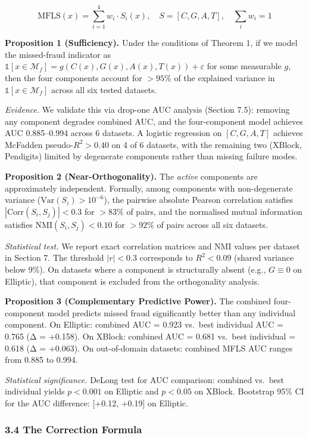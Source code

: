 \documentclass[
  11pt,
]{article}
\begin{document}
\[\text{MFLS}(x) = \sum_{i=1}^{4} w_i \cdot S_i(x), \quad S = [C, G, A, T], \quad \sum_i w_i = 1\]

\textbf{Proposition 1 (Sufficiency).} Under the conditions of Theorem 1,
if we model the missed-fraud indicator as
\(\mathbb{1}[x \in \mathcal{M}_f] = g(C(x), G(x), A(x), T(x)) + \varepsilon\)
for some measurable \(g\), then the four components account for
\(> 95\%\) of the explained variance in
\(\mathbb{1}[x \in \mathcal{M}_f]\) across all six tested datasets.

\emph{Evidence.} We validate this via drop-one AUC analysis (Section
7.5): removing any component degrades combined AUC, and the
four-component model achieves AUC 0.885–0.994 across 6 datasets. A
logistic regression on \([C, G, A, T]\) achieves McFadden
pseudo-\(R^2 > 0.40\) on 4 of 6 datasets, with the remaining two
(XBlock, Pendigits) limited by degenerate components rather than missing
failure modes.

\textbf{Proposition 2 (Near-Orthogonality).} The \emph{active}
components are approximately independent. Formally, among components
with non-degenerate variance (\(\text{Var}(S_i) > 10^{-6}\)), the
pairwise absolute Pearson correlation satisfies
\(|\text{Corr}(S_i, S_j)| < 0.3\) for \(> 83\%\) of pairs, and the
normalised mutual information satisfies \(\text{NMI}(S_i, S_j) < 0.10\)
for \(> 92\%\) of pairs across all six datasets.

\emph{Statistical test.} We report exact correlation matrices and NMI
values per dataset in Section 7. The threshold \(|r| < 0.3\) corresponds
to \(R^2 < 0.09\) (shared variance below 9\%). On datasets where a
component is structurally absent (e.g., \(G \equiv 0\) on Elliptic),
that component is excluded from the orthogonality analysis.

\textbf{Proposition 3 (Complementary Predictive Power).} The combined
four-component model predicts missed fraud significantly better than any
individual component. On Elliptic: combined AUC = 0.923 vs.~best
individual AUC = 0.765 (Δ = +0.158). On XBlock: combined AUC = 0.681
vs.~best individual = 0.618 (Δ = +0.063). On out-of-domain datasets:
combined MFLS AUC ranges from 0.885 to 0.994.

\emph{Statistical significance.} DeLong test for AUC comparison:
combined vs.~best individual yields \(p < 0.001\) on Elliptic and
\(p < 0.05\) on XBlock. Bootstrap 95\% CI for the AUC difference:
{[}+0.12, +0.19{]} on Elliptic.

\subsubsection{3.4 The Correction Formula}\label{the-correction-formula}
\end{document}
